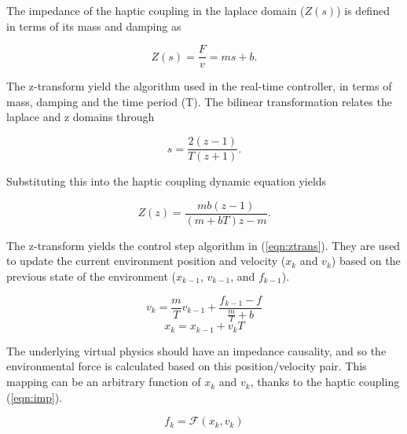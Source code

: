 \documentclass[12pt]{report}
\begin{document}
		
		
	
	
	The impedance of the haptic coupling in the laplace domain ($Z(s)$) is defined in terms of its mass and damping as
	
	\begin{equation} \label{eqn:haptic}
		Z(s) = \frac{F}{v} = ms + b .
	\end{equation}
	
The z-transform \cite{ztrans} yield the algorithm used in the real-time controller, in terms of mass, damping and the time period (T). The bilinear transformation relates the laplace and z domains through

	\begin{equation}
		s = \frac{2(z-1)}{T(z+1)}.
	\end{equation}
	
	Substituting this into the haptic coupling dynamic equation yields

	\begin{equation}
		Z(z) = \frac{mb(z-1)}{(m+bT)z - m}.
	\end{equation}
	
	The z-transform yields the control step algorithm in (\ref{eqn:ztrans}). They are used to update the current environment position and velocity ($x_k$ and $v_k$) based on the previous state of the environment ($x_{k-1}$, $v_{k-1}$, and $f_{k-1}$).

\begin{equation} \label{eqn:ztrans}
	v_k = \frac{m}{T}v_{k-1} + \frac{f_{k-1} - f}{\frac{m}{T} + b}
\end{equation}
\begin{equation}
	x_k = x_{k-1} + v_{k}T
\end{equation}

	
The underlying virtual physics should have an impedance causality, and so the environmental force is calculated based on this position/velocity pair. This mapping can be an arbitrary function of $x_k$ and $v_k$, thanks to the haptic coupling (\ref{eqn:imp}). 
 
\begin{equation} \label{eqn:imp}
	f_k = \mathcal{F}(x_k, v_k)
\end{equation}
\end{document}
